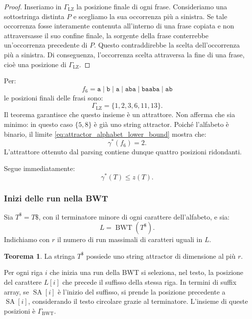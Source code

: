 \documentclass{article}
\theoremstyle{definition}
\newtheorem{theorem}{Teorema}[section] %
\numberwithin{equation}{section}
\begin{document}
\begin{proof}
    Inseriamo in $\Gamma_{\mathrm{LZ}}$ la posizione finale di ogni frase.
    Consideriamo una sottostringa distinta $P$ e scegliamo la sua occorrenza più
    a sinistra. Se tale occorrenza fosse interamente contenuta all'interno di
    una frase copiata e non attraversasse il suo confine finale, la sorgente
    della frase conterrebbe un'occorrenza precedente di $P$. Questo
    contraddirebbe la scelta dell'occorrenza più a sinistra. Di conseguenza,
    l'occorrenza scelta attraversa la fine di una frase, cioè una posizione di
    $\Gamma_{\mathrm{LZ}}$.
\end{proof}

Per:
\[
    f_6=
    \texttt{a}\mid
    \texttt{b}\mid
    \texttt{a}\mid
    \texttt{aba}\mid
    \texttt{baaba}\mid
    \texttt{ab}
\]
le posizioni finali delle frasi sono:
\[
    \Gamma_{\mathrm{LZ}}=\{1,2,3,6,11,13\}.
\]
Il teorema garantisce che questo insieme è un attrattore. Non afferma che sia
minimo: in questo caso $\{5,8\}$ è già uno string attractor.
Poiché l'alfabeto è binario, il limite
\eqref{eq:attractor_alphabet_lower_bound} mostra che:
\[
    \gamma^*(f_6)=2.
\]
L'attrattore ottenuto dal parsing contiene dunque quattro posizioni
ridondanti.

Segue immediatamente:
\begin{equation}\label{eq:gamma_lz_relation}
    \gamma^*(T)\leq z(T).
\end{equation}

\subsubsection{Inizi delle run nella BWT}
Sia $T^\$=T\texttt{\$}$, con il terminatore minore di ogni carattere
dell'alfabeto, e sia:
\[
    L=\operatorname{BWT}(T^\$).
\]
Indichiamo con $r$ il numero di run massimali di caratteri uguali in $L$.

\begin{theorem}\label{theorem_bwt_induces_attractor}
    La stringa $T^\$$ possiede uno string attractor di dimensione al più $r$.
\end{theorem}

Per ogni riga $i$ che inizia una run della BWT si seleziona, nel testo, la
posizione del carattere $L[i]$ che precede il suffisso della stessa riga. In
termini di suffix array, se $\operatorname{SA}[i]$ è l'inizio del suffisso,
si prende la posizione precedente a $\operatorname{SA}[i]$, considerando il
testo circolare grazie al terminatore. L'insieme di queste posizioni è
$\Gamma_{\mathrm{BWT}}$.
\end{document}
